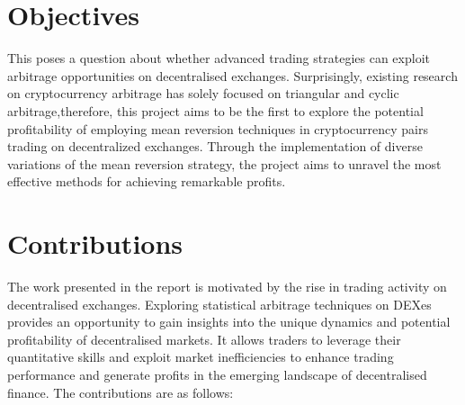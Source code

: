 \section{Objectives}
This poses a question about whether advanced trading strategies can exploit arbitrage opportunities on decentralised exchanges. Surprisingly, existing research on cryptocurrency arbitrage has solely focused on triangular and cyclic arbitrage,therefore, this project aims to be the first to explore the potential profitability of employing mean reversion techniques in cryptocurrency pairs trading on decentralized exchanges. Through the implementation of diverse variations of the mean reversion strategy, the project aims to unravel the most effective methods for achieving remarkable profits.

\section{Contributions}
The work presented in the report is motivated by the rise in trading activity on decentralised exchanges. Exploring statistical arbitrage techniques on DEXes provides an opportunity to gain insights into the unique dynamics and potential profitability of decentralised markets. It allows traders to leverage their quantitative skills and exploit market inefficiencies to enhance trading performance and generate profits in the emerging landscape of decentralised finance. The contributions are as follows:
